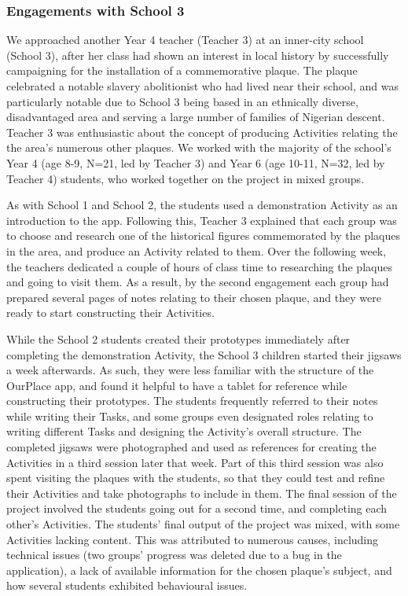 \documentclass[,hyphens]{sigchi}
\begin{document}
\subsubsection{Engagements with School 3}
We approached another Year 4 teacher (Teacher 3) at an inner-city school (School 3), after her class had shown an interest in local history by successfully campaigning for the installation of a commemorative plaque. The plaque celebrated a notable slavery abolitionist who had lived near their school, and was particularly notable due to School 3 being based in an ethnically diverse, disadvantaged area and serving a large number of families of Nigerian descent. Teacher 3 was enthusiastic about the concept of producing Activities relating the the area's numerous other plaques. We worked with the majority of the school's Year 4 (age 8-9, N=21, led by Teacher 3) and Year 6 (age 10-11, N=32, led by Teacher 4) students, who worked together on the project in mixed groups.

As with School 1 and School 2, the students used a demonstration Activity as an introduction to the app. Following this, Teacher 3 explained that each group was to choose and research one of the historical figures commemorated by the plaques in the area, and produce an Activity related to them. Over the following week, the teachers dedicated a couple of hours of class time to researching the plaques and going to visit them. As a result, by the second engagement each group had prepared several pages of notes relating to their chosen plaque, and they were ready to start constructing their Activities.

While the School 2 students created their prototypes immediately after completing the demonstration Activity, the School 3 children started their jigsaws a week afterwards. As such, they were less familiar with the structure of the OurPlace app, and found it helpful to have a tablet for reference while constructing their prototypes. The students frequently referred to their notes while writing their Tasks, and some groups even designated roles relating to writing different Tasks and designing the Activity's overall structure. The completed jigsaws were photographed and used as references for creating the Activities in a third session later that week. Part of this third session was also spent visiting the plaques with the students, so that they could test and refine their Activities and take photographs to include in them. The final session of the project involved the students going out for a second time, and completing each other's Activities. The students' final output of the project was mixed, with some Activities lacking content. This was attributed to numerous causes, including technical issues (two groups' progress was deleted due to a bug in the application), a lack of available information for the chosen plaque's subject, and how several students exhibited behavioural issues.
\end{document}
